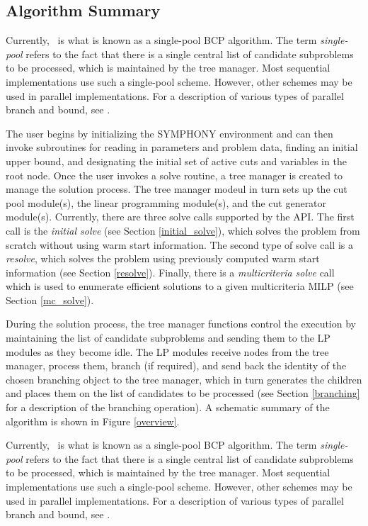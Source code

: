 \subsection{Algorithm Summary}
\label{symphony}

Currently, \BB\ is what is known as a single-pool BCP algorithm.
The term {\em single-pool} refers to the fact that there is a single
central list of candidate subproblems to be processed, which is
maintained by the tree manager. Most sequential implementations use
such a single-pool scheme. However, other schemes may be used in
parallel implementations. For a description of various types of
parallel branch and bound, see \cite{G&C}.

The user begins by initializing the SYMPHONY environment and can then invoke
subroutines for reading in parameters and problem data, finding an initial
upper bound, and designating the initial set of active cuts and variables in
the root node. Once the user invokes a solve routine, a tree manager is
created to manage the solution process. The tree manager modeul in turn sets
up the cut pool module(s), the linear programming module(s), and the cut
generator module(s). Currently, there are three solve calls supported by the
API. The first call is the \emph{initial solve} (see Section
\ref{initial_solve}), which solves the problem from scratch without using warm
start information. The second type of solve call is a \emph{resolve}, which
solves the problem using previously computed warm start information (see
Section \ref{resolve}). Finally, there is a \emph{multicriteria solve} call
which is used to enumerate efficient solutions to a given multicriteria MILP
(see Section \ref{mc_solve}).

During the solution process, the tree manager functions control the execution
by maintaining the list of candidate subproblems and sending them to the LP
modules as they become idle. The LP modules receive nodes from the tree
manager, process them, branch (if required), and send back the identity of the
chosen branching object to the tree manager, which in turn generates the
children and places them on the list of candidates to be processed (see
Section \ref{branching} for a description of the branching operation). A
schematic summary of the algorithm is shown in Figure \ref{overview}.

Currently, \BB\ is what is known as a single-pool BCP algorithm.
The term {\em single-pool} refers to the fact that there is a single
central list of candidate subproblems to be processed, which is
maintained by the tree manager. Most sequential implementations use
such a single-pool scheme. However, other schemes may be used in
parallel implementations. For a description of various types of
parallel branch and bound, see \cite{G&C}.


